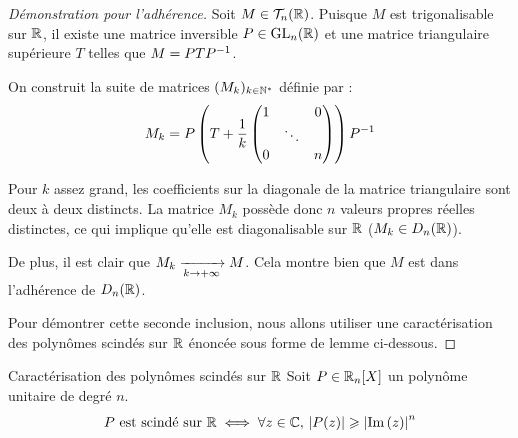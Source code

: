 \begin{proof}[Démonstration pour l'adhérence]
    
    \svspace
    Soit $M \in \mathcal{T}_n(\mathbb{R})$. Puisque $M$ est trigonalisable sur $\mathbb{R}$, il existe une matrice inversible $P \in \operatorname{GL}_n(\mathbb{R})$ et une matrice triangulaire supérieure $T$ telles que $M = P T P^{-1}$. 
    
    On construit la suite de matrices $(M_k)_{k \in \mathbb{N}^*}$ définie par :
    \[ M_k = P \left( T + \frac{1}{k} \begin{pmatrix} 
        1 & & 0 \\ 
        & \ddots & \\ 
        0 & & n 
    \end{pmatrix} \right) P^{-1} \]
    
    Pour $k$ assez grand, les coefficients sur la diagonale de la matrice triangulaire sont deux à deux distincts. La matrice $M_k$ possède donc $n$ valeurs propres réelles distinctes, ce qui implique qu'elle est diagonalisable sur $\mathbb{R}$ ($M_k \in D_n(\mathbb{R})$).
    
    De plus, il est clair que $M_k \xrightarrow[k \to +\infty]{} M$. Cela montre bien que $M$ est dans l'adhérence de $D_n(\mathbb{R})$.

    \avspace

    \svspace
    Pour démontrer cette seconde inclusion, nous allons utiliser une caractérisation des polynômes scindés sur $\mathbb{R}$ énoncée sous forme de lemme ci-dessous.
\end{proof}

\begin{proposition}{Caractérisation des polynômes scindés sur $\mathbb{R}$}{}
    Soit $P \in \mathbb{R}_n[X]$ un polynôme unitaire de degré $n$.
    \[ P \text{ est scindé sur } \mathbb{R} \iff \forall z \in \mathbb{C}, \, \left|P(z)\right| \geqslant \left|\operatorname{Im} \,(z)\right|^n \]
\end{proposition}


